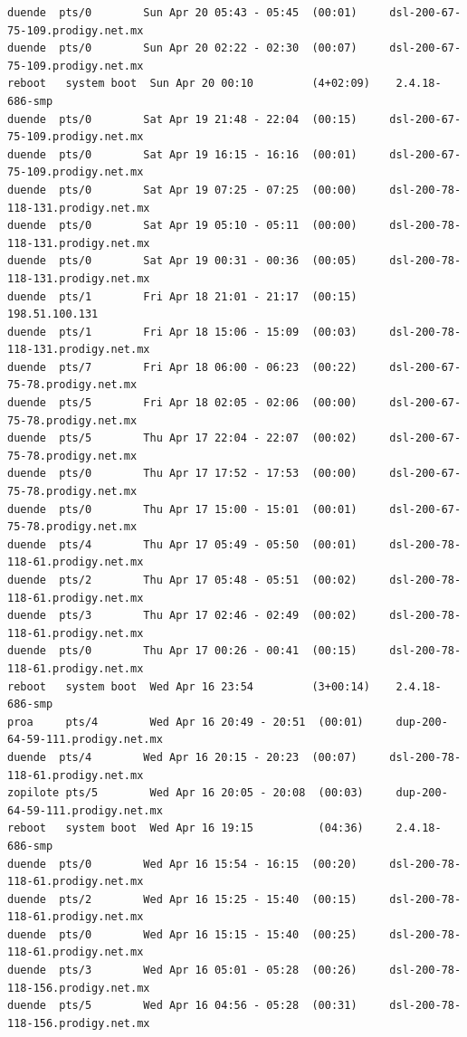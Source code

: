 \begin{lstlisting}[style=terminal]
duende  pts/0        Sun Apr 20 05:43 - 05:45  (00:01)     dsl-200-67-75-109.prodigy.net.mx
duende  pts/0        Sun Apr 20 02:22 - 02:30  (00:07)     dsl-200-67-75-109.prodigy.net.mx
reboot   system boot  Sun Apr 20 00:10         (4+02:09)    2.4.18-686-smp
duende  pts/0        Sat Apr 19 21:48 - 22:04  (00:15)     dsl-200-67-75-109.prodigy.net.mx
duende  pts/0        Sat Apr 19 16:15 - 16:16  (00:01)     dsl-200-67-75-109.prodigy.net.mx
duende  pts/0        Sat Apr 19 07:25 - 07:25  (00:00)     dsl-200-78-118-131.prodigy.net.mx
duende  pts/0        Sat Apr 19 05:10 - 05:11  (00:00)     dsl-200-78-118-131.prodigy.net.mx
duende  pts/0        Sat Apr 19 00:31 - 00:36  (00:05)     dsl-200-78-118-131.prodigy.net.mx
duende  pts/1        Fri Apr 18 21:01 - 21:17  (00:15)     198.51.100.131
duende  pts/1        Fri Apr 18 15:06 - 15:09  (00:03)     dsl-200-78-118-131.prodigy.net.mx
duende  pts/7        Fri Apr 18 06:00 - 06:23  (00:22)     dsl-200-67-75-78.prodigy.net.mx
duende  pts/5        Fri Apr 18 02:05 - 02:06  (00:00)     dsl-200-67-75-78.prodigy.net.mx
duende  pts/5        Thu Apr 17 22:04 - 22:07  (00:02)     dsl-200-67-75-78.prodigy.net.mx
duende  pts/0        Thu Apr 17 17:52 - 17:53  (00:00)     dsl-200-67-75-78.prodigy.net.mx
duende  pts/0        Thu Apr 17 15:00 - 15:01  (00:01)     dsl-200-67-75-78.prodigy.net.mx
duende  pts/4        Thu Apr 17 05:49 - 05:50  (00:01)     dsl-200-78-118-61.prodigy.net.mx
duende  pts/2        Thu Apr 17 05:48 - 05:51  (00:02)     dsl-200-78-118-61.prodigy.net.mx
duende  pts/3        Thu Apr 17 02:46 - 02:49  (00:02)     dsl-200-78-118-61.prodigy.net.mx
duende  pts/0        Thu Apr 17 00:26 - 00:41  (00:15)     dsl-200-78-118-61.prodigy.net.mx
reboot   system boot  Wed Apr 16 23:54         (3+00:14)    2.4.18-686-smp
proa     pts/4        Wed Apr 16 20:49 - 20:51  (00:01)     dup-200-64-59-111.prodigy.net.mx
duende  pts/4        Wed Apr 16 20:15 - 20:23  (00:07)     dsl-200-78-118-61.prodigy.net.mx
zopilote pts/5        Wed Apr 16 20:05 - 20:08  (00:03)     dup-200-64-59-111.prodigy.net.mx
reboot   system boot  Wed Apr 16 19:15          (04:36)     2.4.18-686-smp
duende  pts/0        Wed Apr 16 15:54 - 16:15  (00:20)     dsl-200-78-118-61.prodigy.net.mx
duende  pts/2        Wed Apr 16 15:25 - 15:40  (00:15)     dsl-200-78-118-61.prodigy.net.mx
duende  pts/0        Wed Apr 16 15:15 - 15:40  (00:25)     dsl-200-78-118-61.prodigy.net.mx
duende  pts/3        Wed Apr 16 05:01 - 05:28  (00:26)     dsl-200-78-118-156.prodigy.net.mx
duende  pts/5        Wed Apr 16 04:56 - 05:28  (00:31)     dsl-200-78-118-156.prodigy.net.mx

\end{lstlisting}
